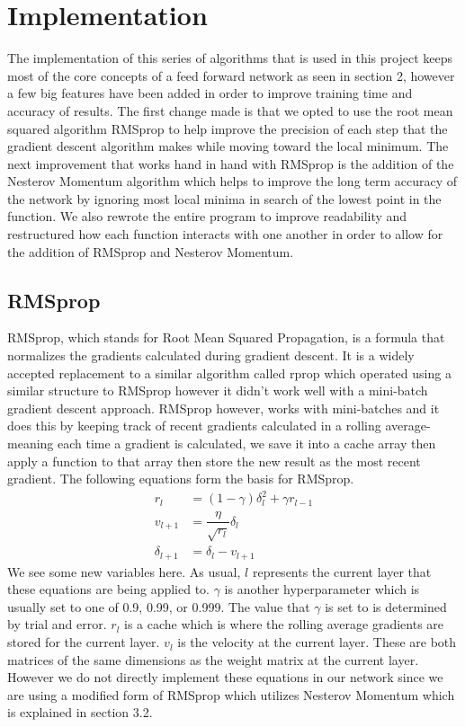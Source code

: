\documentclass[12pt]{article}
\theoremstyle{definition}
\theoremstyle{plain}
\begin{document}
\section{Implementation}
The implementation of this series of algorithms that is used in this project keeps most of the core concepts of a feed forward network as seen in section 2, however a few big features have been added in order to improve training time and accuracy of results. The first change made is that we opted to use the root mean squared algorithm RMSprop to help improve the precision of each step that the gradient descent algorithm makes while moving toward the local minimum. The next improvement that works hand in hand with RMSprop is the addition of the Nesterov Momentum algorithm which helps to improve the long term accuracy of the network by ignoring most local minima in search of the lowest point in the function. We also rewrote the entire program to improve readability and restructured how each function interacts with one another in order to allow for the addition of RMSprop and Nesterov Momentum.

\subsection{RMSprop}
RMSprop, which stands for Root Mean Squared Propagation, is a formula that normalizes the gradients calculated during gradient descent. It is a widely accepted replacement to a similar algorithm called rprop which operated using a similar structure to RMSprop however it didn't work well with a mini-batch gradient descent approach. RMSprop however, works with mini-batches and it does this by keeping track of recent gradients calculated in a rolling average\-- meaning each time a gradient is calculated, we save it into a cache array then apply a function to that array then store the new result as the most recent gradient. The following equations form the basis for RMSprop\cite{readthedocs}.
\begin{align}\label{eqn:RMSprop}
r_l &= (1-\gamma)\delta_l^2 + \gamma r_{l-1}\\
v_{l+1} &= \dfrac{\eta}{\sqrt{r_l}}\delta_l\\
\delta_{l+1} &= \delta_l - v_{l+1}
\end{align}
We see some new variables here. As usual, $l$ represents the current layer that these equations are being applied to. $\gamma$ is another hyperparameter which is usually set to one of 0.9, 0.99, or 0.999\cite{cs321n}. The value that $\gamma$ is set to is determined by trial and error. $r_l$ is a cache which is where the rolling average gradients are stored for the current layer. $v_l$ is the velocity at the current layer. These are both matrices of the same dimensions as the weight matrix at the current layer. However we do not directly implement these equations in our network since we are using a modified form of RMSprop which utilizes Nesterov Momentum which is explained in section 3.2.
\end{document}
